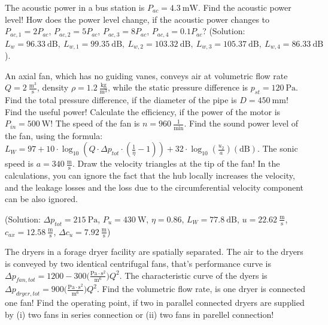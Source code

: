 
\vspace{1cm}

The acoustic power in a bus station is $P_{ac} = 4.3~\mathrm{mW}$. Find the acoustic power level! How does the power level change, if the acoustic power changes to $P_{ac,1} = 2P_{ac}$, $P_{ac,2} = 5P_{ac}$, $P_{ac,3} = 8P_{ac}$, $P_{ac,4} = 0.1P_{ac}$? (Solution: $L_w = 96.33~\mathrm{dB},~L_{w,1} = 99.35~\mathrm{dB},~L_{w,2} = 103.32~\mathrm{dB},~L_{w,3} = 105.37~\mathrm{dB},~L_{w,4} = 86.33~\mathrm{dB}$).


\vspace{1cm}

An axial fan, which has no guiding vanes, conveys air at volumetric flow rate $Q=2~\frac{\mathrm{m^3}}{\mathrm{s}}$, density $\rho=1.2~\frac{\mathrm{kg}}{\mathrm{m^3}}$, while the static pressure difference is $p_{st} = 120~\mathrm{Pa}$. Find the total pressure difference, if the  diameter of the pipe is $D=450~\mathrm{mm}$! Find the useful power! Calculate the efficiency, if the power of the motor is $P_{in} = 500~\mathrm{W}$! The speed of the fan is $n=960~\frac{\mathrm{1}}{\mathrm{min}}$. Find the sound power level of the fan, using the formula: $L_W = 97 + 10\cdot \log_{10}(Q\cdot \Delta p_{tot} \cdot (\frac{1}{\eta}-1)) + 32\cdot \log_{10}(\frac{u_2}{a})(\mathrm{dB})$. The sonic speed is $a=340~\frac{\mathrm{m}}{\mathrm{s}}$. Draw the velocity triangles at the tip of the fan! In the calculations, you can ignore the fact that the hub locally increases the velocity, and the leakage losses and the loss due to the circumferential velocity component can be also ignored.

(Solution: $\Delta p_{tot} = 215~\mathrm{Pa}$, $P_u = 430~\mathrm{W}$, $\eta = 0.86$, $L_W = 77.8~\mathrm{dB}$, $u = 22.62~\frac{\mathrm{m}}{\mathrm{s}}$, $c_{ax} = 12.58~\frac{\mathrm{m}}{\mathrm{s}}$, $\Delta c_{u} = 7.92~\frac{\mathrm{m}}{\mathrm{s}}$)

\vspace{1cm}

The dryers in a forage dryer facility are spatially separated. The air to the dryers is conveyed by two identical centrifugal fans, that's performance curve is $\Delta p_{fan,tot} = 1200 - 300\Big(\frac{\mathrm{Pa}\cdot\mathrm{s^2}}{\mathrm{m^6}} \Big)Q^2$. The characteristic curve of the dyers is $\Delta p_{dryer,tot} = 900\Big(\frac{\mathrm{Pa}\cdot\mathrm{s^2}}{\mathrm{m^6}}\Big) Q^2$. Find the volumetric flow rate, is one dryer is connected one fan! Find the operating point, if two in parallel connected dryers are supplied by (i) two fans in series connection or (ii) two fans in parellel connection!

